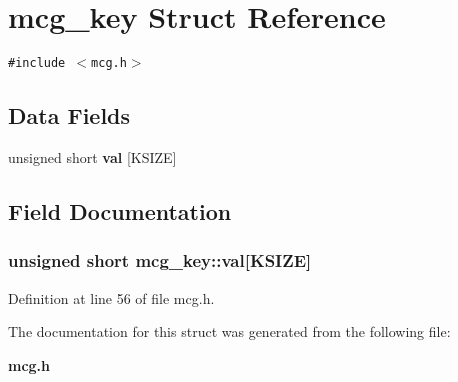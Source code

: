 \section{mcg\_\-key Struct Reference}
\label{structmcg__key}
{\tt \#include $<$mcg.h$>$}

\subsection*{Data Fields}
\begin{CompactItemize}
\item 
unsigned short {\bf val} [KSIZE]
\end{CompactItemize}


\subsection{Field Documentation}
\subsubsection{\setlength{\rightskip}{0pt plus 5cm}unsigned short {\bf mcg\_\-key::val}[KSIZE]}\label{structmcg__key_o0}




Definition at line 56 of file mcg.h.

The documentation for this struct was generated from the following file:\begin{CompactItemize}
\item 
{\bf mcg.h}\end{CompactItemize}

